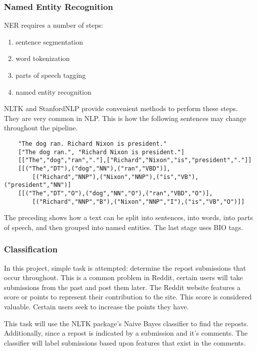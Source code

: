 \documentclass[12pt,a4paper]{article}
\begin{document}
\subsubsection{Named Entity Recognition}

NER requires a number of steps:

\begin{enumerate}
	\item sentence segmentation
	\item word tokenization
	\item parts of speech tagging
	\item named entity recognition
\end{enumerate}

NLTK and StanfordNLP provide convenient methods to perform these steps.
They are very common in NLP. This is how the following sentences
may change throughout the pipeline.

\begin{lstlisting}
	"The dog ran. Richard Nixon is president."
	["The dog ran.", "Richard Nixon is president."]
	[["The","dog","ran","."],["Richard","Nixon","is","president","."]]
	[[("The","DT"),("dog","NN"),("ran","VBD")],
		[("Richard","NNP"),("Nixon","NNP"),("is","VB"),("president","NN")]
	[[("The","DT","O"),("dog","NN","O"),("ran","VBD","O")],
		[("Richard","NNP","B"),("Nixon","NNP","I"),("is","VB","O")]]
\end{lstlisting}

The preceding shows how a text can be split into sentences, into words, into parts
of speech, and then grouped into named entities. The last stage uses BIO tags.

\subsubsection{Classification}

In this project, simple task is attempted: determine the repost submissions that occur throughout. This is a common problem in Reddit, certain users will take submissions
from the past and post them later. The Reddit website features a score or points
to represent their contribution to the site. This score is considered valuable.
Certain users seek to increase the points they have.

This task will use the NLTK package's Naive Bayes classifier to find the reposts.
Additionally, since a repost is indicated by a submission and it's comments. The
classifier will label submissions based upon features that exist in the comments.
\end{document}
